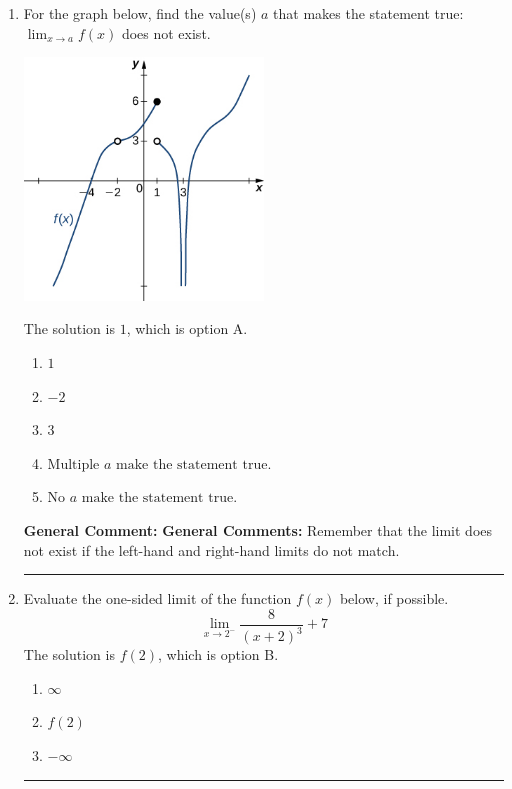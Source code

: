 \documentclass{extbook}[14pt]
\newcommand{\litem}[1]{\item #1

\rule{\textwidth}{0.4pt}}
\begin{document}
\begin{enumerate}\litem{
For the graph below, find the value(s) $a$ that makes the statement true: $ \displaystyle \lim_{x \rightarrow a} f(x)$ does not exist.

\begin{center}
    \includegraphics[width=0.5\textwidth]{../Figures/evaluateLimitGraphicallyCopyC.png}
\end{center}


The solution is \( 1 \), which is option A.\begin{enumerate}[label=\Alph*.]
\item \( 1 \)


\item \( -2 \)


\item \( 3 \)


\item \( \text{Multiple } a \text{ make the statement true}. \)


\item \( \text{No } a \text{ make the statement true}. \)


\end{enumerate}

\textbf{General Comment:} \textbf{General Comments:} Remember that the limit does not exist if the left-hand and right-hand limits do not match.
}
\litem{
Evaluate the one-sided limit of the function $f(x)$ below, if possible.
\[ \lim_{x \rightarrow 2^-} \frac{8}{(x+2)^3}+7 \]The solution is \( f(2) \), which is option B.\begin{enumerate}[label=\Alph*.]
\item \( \infty \)


\item \( f(2) \)


\item \( -\infty \)



\end{enumerate}}
\end{enumerate}
\end{document}
